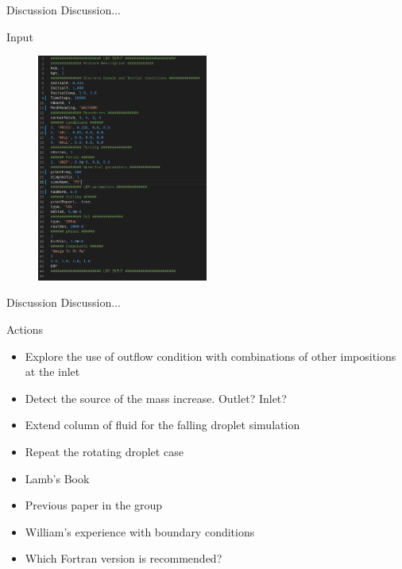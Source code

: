 \documentclass[8pt]{beamer}
\begin{document}
	\begin{frame}{Discussion}
		Discussion...
	\end{frame}
	
	\begin{frame}{Input}
		\begin{figure}
			\centering
			\includegraphics[width=0.5\textwidth]{pics/modelInput.png}
		\end{figure}
	\end{frame}
	
	\begin{frame}{Discussion}
		Discussion...
	\end{frame}
	
	\begin{frame}{Actions}
		\begin{itemize}
			\item Explore the use of outflow condition with combinations of other impositions at the inlet
			\item Detect the source of the mass increase. Outlet? Inlet?
			\item Extend column of fluid for the falling droplet simulation
			\item Repeat the rotating droplet case
			\item Lamb's Book
			\item Previous paper in the group
			\item William's experience with boundary conditions
			\item Which Fortran version is recommended?
		\end{itemize}
	\end{frame}
	
\end{document}
